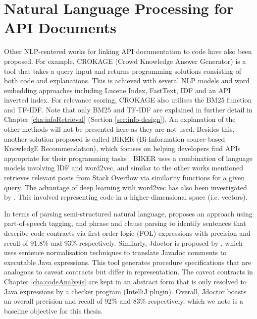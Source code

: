 \section{Natural Language Processing for API Documents}
\label{sec:related-nlp}
Other NLP-centered works for linking API documentation to code have also been proposed. For example, CROKAGE (Crowd Knowledge Answer Generator) is a tool that takes a query input and returns programming solutions consisting of both code and explanations. This is achieved with several NLP models and word embedding approaches including Lucene Index, FastText, IDF and an API inverted index. For relevance scoring, CROKAGE also utilises the BM25 function and TF-IDF. Note that only BM25 and TF-IDF are explained in further detail in Chapter \ref{cha:infoRetrieval} (Section \ref{sec:info-design}). An explanation of the other methods will not be presented here as they are not used. Besides this, another solution proposed is called BIKER (Bi-Information source-based KnowledgE Recommendation), which focuses on helping developers find APIs appropriate for their programming tasks \cite{huang2018api}. BIKER uses a combination of language models involving IDF and word2vec, and similar to the other works mentioned retrieves relevant posts from Stack Overflow via similarity functions for a given query. The advantage of deep learning with word2vec has also been investigated by \cite{van2017combining}. This involved representing code in a higher-dimensional space (i.e. vectors). \bigbreak

In terms of parsing semi-structured natural language, \cite{pandita2012inferring} proposes an approach using part-of-speech tagging, and phrase and clause parsing to identify sentences that describe code contracts via first-order logic (FOL) expressions with precision and recall of 91.8\% and 93\% respectively. Similarly, Jdoctor is proposed by \cite{blasi2018translating}, which uses sentence normalisation techniques to translate Javadoc comments to executable Java expressions. This tool generates procedure specifications that are analogous to caveat contracts but differ in representation.  The caveat contracts in Chapter \ref{cha:codeAnalysis} are kept in an abstract form that is only resolved to Java expressions by a checker program (IntelliJ plugin). Overall, Jdoctor boasts an overall precision and recall of 92\% and 83\% respectively, which we note is a baseline objective for this thesis.

